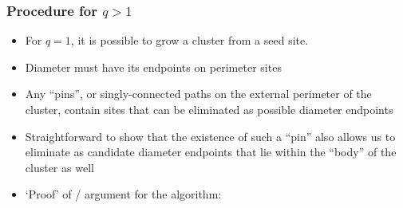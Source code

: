 \documentclass[11pt]{article}
\begin{document}
\subsubsection{Procedure for $q>1$}
\label{sec-5-2-4}
\begin{itemize}

\item For $q=1$, it is possible to grow a cluster from a seed site.\\
\label{sec-5-2-4-1}%
\item Diameter must have its endpoints on perimeter sites\\
\label{sec-5-2-4-2}%
\item Any ``pins'', or singly-connected paths on the external perimeter of the cluster, contain sites that can be eliminated as possible diameter endpoints\\
\label{sec-5-2-4-3}%
\item Straightforward to show that the existence of such a ``pin'' also allows us to eliminate as candidate diameter endpoints that lie within the ``body'' of the cluster as well\\
\label{sec-5-2-4-4}%
\item `Proof' of / argument for the algorithm:
\label{sec-5-2-4-5}%
\begin{itemize}


\end{itemize}
\end{itemize}
\end{document}
